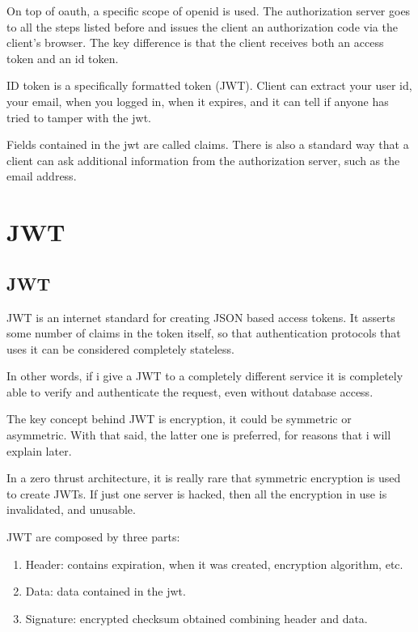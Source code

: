 \documentclass{style}
\begin{document}
On top of oauth, a specific scope of openid is used. The authorization server
goes to all the steps listed before and issues the client an authorization code
via the client's browser.
The key difference is that the client receives both an access token and an id
token.

ID token is a specifically formatted token (JWT). Client can extract your user
id, your email, when you logged in, when it expires, and it can tell if anyone
has tried to tamper with the jwt.

Fields contained in the jwt are called claims.
There is also a standard way that a client can ask additional information from the
authorization server, such as the email address.

\section{JWT}
\subsection{JWT}
JWT is an internet standard for creating JSON based access tokens. It asserts
some number of claims in the token itself, so that authentication protocols that
uses it can be considered completely stateless.

In other words, if i give a JWT to a completely different service
it is completely able to verify and authenticate the request, even without
database access.

The key concept behind JWT is encryption, it could be symmetric or asymmetric.
With that said, the latter one is preferred, for reasons that i will explain
later.

In a zero thrust architecture, it is really rare that symmetric encryption is
used to create JWTs. If just one server is hacked, then all the encryption in
use is invalidated, and unusable.

JWT are composed by three  parts:

\begin{enumerate}
    \item Header: contains expiration, when it was created, encryption
        algorithm, etc.
    \item Data: data contained in the jwt.
    \item Signature: encrypted checksum obtained combining header and data.
\end{enumerate}
\end{document}
